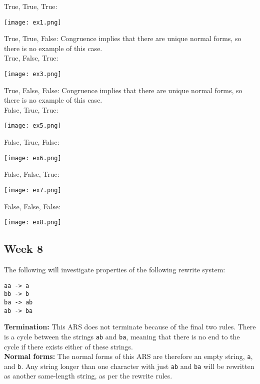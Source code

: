 \documentclass{article}
\theoremstyle{theorem}
\theoremstyle{definition}
\theoremstyle{remark}
\begin{document}
True, True, True:
\begin{center}
    \texttt{[image: ex1.png]}
\end{center}

True, True, False: Congruence implies that there are unique normal forms, so there is no example of this case.\\

True, False, True:
\begin{center}
    \texttt{[image: ex3.png]}
\end{center}

True, False, False: Congruence implies that there are unique normal forms, so there is no example of this case.\\

False, True, True:
\begin{center}
    \texttt{[image: ex5.png]}
\end{center}

False, True, False:
\begin{center}
    \texttt{[image: ex6.png]}
\end{center}

False, False, True:
\begin{center}
    \texttt{[image: ex7.png]}
\end{center}

False, False, False:
\begin{center}
    \texttt{[image: ex8.png]}
\end{center}
\newpage

\subsection{Week 8}
The following will investigate properties of the following rewrite system:
\begin{lstlisting}
aa -> a
bb -> b
ba -> ab
ab -> ba
\end{lstlisting}

\noindent \textbf{Termination: } This ARS does not terminate because of the final two rules. There is a cycle between the strings \texttt{ab} and \texttt{ba}, meaning that there is no end to the cycle if there exists either of these strings.\\

\noindent \textbf{Normal forms: } The normal forms of this ARS are therefore an empty string, \texttt{a}, and \texttt{b}. Any string longer than one character with just \texttt{ab} and \texttt{ba} will be rewritten as another same-length string, as per the rewrite rules.\\
\end{document}
